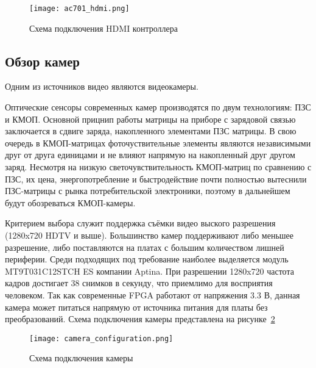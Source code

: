 \begin{figure}[ht]
  \centering
  \texttt{[image: ac701\_hdmi.png]}
  \caption{ Схема подключения HDMI контроллера }
  \label{fig:domain:ac701:hdmi}
\end{figure}

\subsection{Обзор камер}
\label{sub:domain:camera}

Одним из источников видео являются видеокамеры.

Оптические сенсоры современных камер производятся по двум технологиям: ПЗС и КМОП.
Основной прицнип работы матрицы на приборе с зарядовой связью заключается в сдвиге заряда,
накопленного элементами ПЗС матрицы.
В свою очередь в КМОП-матрицах фоточуствительные элементы являются независимыми друг от друга единицами
и не влияют напрямую на накопленный друг другом заряд.
Несмотря на низкую светочувствительность КМОП-матриц по сравнению с ПЗС, их цена, энергопотребление и
быстродействие почти полностью вытеснили ПЗС-матрицы с рынка потребительской электроники, поэтому
в дальнейшем будут обозреваться КМОП-камеры.

Критерием выбора служит поддержка съёмки видео выского разрешения (1280x720 HDTV и выше).
Большинство камер поддерживают либо меньшее разрешение, либо поставляются на платах с большим
количеством лишней периферии. Среди подходящих под требование наиболее выделяется модуль
MT9T031C12STCH ES компании Aptina. При разрешении 1280x720 частота кадров достигает 38 снимков в секунду,
что приемлимо для восприятия человеком. Так как современные FPGA работают от напряжения 3.3 В, данная камера
может питаться напрямую от источника питания для платы без преобразований\cite{image_sensor_datasheet}.
Схема подключения камеры представлена на рисунке~\ref{fig:domain:camera:camera_configuration}

\begin{figure}[ht]
  \centering
  \texttt{[image: camera\_configuration.png]}
  \caption{ Схема подключения камеры \cite{camera_module_datasheet} }
  \label{fig:domain:camera:camera_configuration}
\end{figure}



